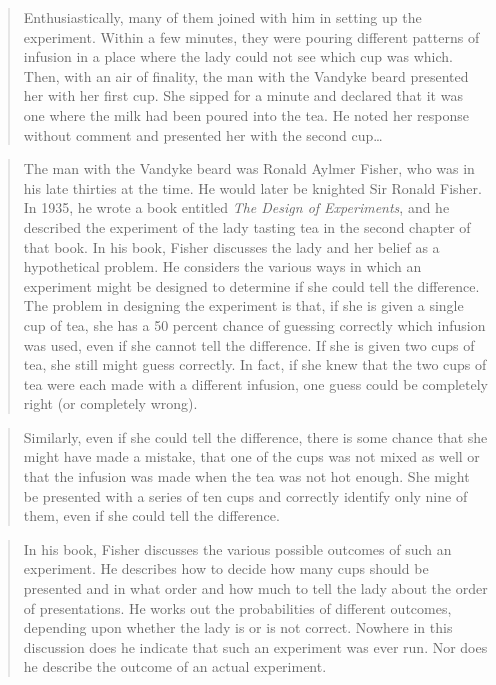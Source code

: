 \documentclass[]{tufte-book}
\begin{document}
\begin{quote}
Enthusiastically, many of them joined with him in setting up the
experiment. Within a few minutes, they were pouring different patterns
of infusion in a place where the lady could not see which cup was which.
Then, with an air of finality, the man with the Vandyke beard presented
her with her first cup. She sipped for a minute and declared that it was
one where the milk had been poured into the tea. He noted her response
without comment and presented her with the second cup\ldots{}
\end{quote}

\begin{quote}
The man with the Vandyke beard was Ronald Aylmer Fisher, who was in his
late thirties at the time. He would later be knighted Sir Ronald Fisher.
In 1935, he wrote a book entitled \emph{The Design of Experiments}, and
he described the experiment of the lady tasting tea in the second
chapter of that book. In his book, Fisher discusses the lady and her
belief as a hypothetical problem. He considers the various ways in which
an experiment might be designed to determine if she could tell the
difference. The problem in designing the experiment is that, if she is
given a single cup of tea, she has a 50 percent chance of guessing
correctly which infusion was used, even if she cannot tell the
difference. If she is given two cups of tea, she still might guess
correctly. In fact, if she knew that the two cups of tea were each made
with a different infusion, one guess could be completely right (or
completely wrong).
\end{quote}

\begin{quote}
Similarly, even if she could tell the difference, there is some chance
that she might have made a mistake, that one of the cups was not mixed
as well or that the infusion was made when the tea was not hot enough.
She might be presented with a series of ten cups and correctly identify
only nine of them, even if she could tell the difference.
\end{quote}

\begin{quote}
In his book, Fisher discusses the various possible outcomes of such an
experiment. He describes how to decide how many cups should be presented
and in what order and how much to tell the lady about the order of
presentations. He works out the probabilities of different outcomes,
depending upon whether the lady is or is not correct. Nowhere in this
discussion does he indicate that such an experiment was ever run. Nor
does he describe the outcome of an actual experiment.
\end{quote}
\end{document}
